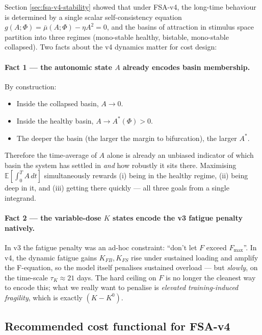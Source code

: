 Section \ref{sec:fsa-v4-stability} showed that under FSA-v4, the long-time behaviour is determined by a single scalar self-consistency equation $g(A;\Phi) = \bar\mu(A;\Phi) - \eta A^2 = 0$, and the basins of attraction in stimulus space partition into three regimes (mono-stable healthy, bistable, mono-stable collapsed). Two facts about the v4 dynamics matter for cost design:

\paragraph{Fact 1 --- the autonomic state $A$ already encodes basin membership.}
By construction:
\begin{itemize}
  \item Inside the collapsed basin, $A \to 0$.
  \item Inside the healthy basin, $A \to A^*(\Phi) > 0$.
  \item The deeper the basin (the larger the margin to bifurcation), the larger $A^*$.
\end{itemize}
Therefore the time-average of $A$ alone is already an unbiased indicator of which basin the system has settled in \emph{and} how robustly it sits there. Maximising $\mathbb{E}\!\left[\int_0^T A\, dt\right]$ simultaneously rewards (i) being in the healthy regime, (ii) being deep in it, and (iii) getting there quickly --- all three goals from a single integrand.

\paragraph{Fact 2 --- the variable-dose $K$ states encode the v3 fatigue penalty natively.}
In v3 the fatigue penalty was an ad-hoc constraint: ``don't let $F$ exceed $F_{\max}$''. In v4, the dynamic fatigue gains $K_{FB}, K_{FS}$ rise under sustained loading and amplify the F-equation, so the model itself penalises sustained overload --- but \emph{slowly}, on the time-scale $\tau_K \approx 21$ days. The hard ceiling on $F$ is no longer the cleanest way to encode this; what we really want to penalise is \emph{elevated training-induced fragility}, which is exactly $(K - K^0)$.

\subsection{Recommended cost functional for FSA-v4}

